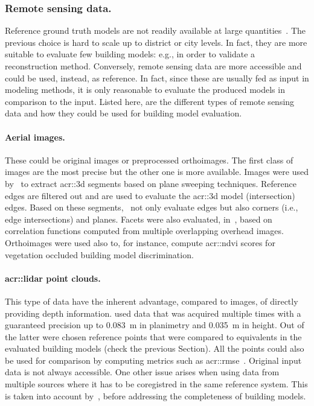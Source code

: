         \subsubsection{Remote sensing data.}
            Reference ground truth models are not readily available at large quantities~\parencite{schuster2003new}.
            The previous choice is hard to scale up to district or city levels.
            In fact, they are more suitable to evaluate few building models: e.g., in order to validate a reconstruction method.
            Conversely, remote sensing data are more accessible and could be used, instead, as reference.
            In fact, since these are usually fed as input in modeling methods, it is only reasonable to evaluate the produced models in comparison to the input.
            Listed here, are the different types of remote sensing data and how they could be used for building model evaluation.\\

            \paragraph{Aerial images.}
                These could be original images or preprocessed orthoimages.
                The first class of images are the most precise but the other one is more available.
                Images were used by~\textcite{michelin2013quality} to extract \gls{acr::3d} segments based on plane sweeping techniques.
                Reference edges are filtered out and are used to evaluate the \gls{acr::3d} model (intersection) edges.
                Based on these segments,~\textcite{boudet2006supervised} not only evaluate edges but also corners (i.e., edge intersections) and planes.
                Facets were also evaluated, in~\parencite{boudet2006supervised}, based on correlation functions computed from multiple overlapping overhead images.
                Orthoimages were used also to, for instance, compute \gls{acr::ndvi} scores for vegetation occluded building model discrimination.

            \paragraph{\gls{acr::lidar} point clouds.}
                This type of data have the inherent advantage, compared to images, of directly providing depth information.
                \textcite{kaartinen2005accuracy} used data that was acquired multiple times with a guaranteed precision up to \SI{0.083}{\m} in planimetry and \SI{0.035}{\m} in height.
                Out of the latter were chosen reference points that were compared to equivalents in the evaluated building models (check the previous Section).
                All the points could also be used for comparison by computing metrics such as \gls{acr::rmse}~\parencite{lafarge2012creating,zhu2018large}.
                Original input data is not always accessible.
                One other issue arises when using data from multiple sources where it has to be coregistred in the same reference system.
                This is taken into account by~\textcite{akca2010quality}, before addressing the completeness of building models.
            
